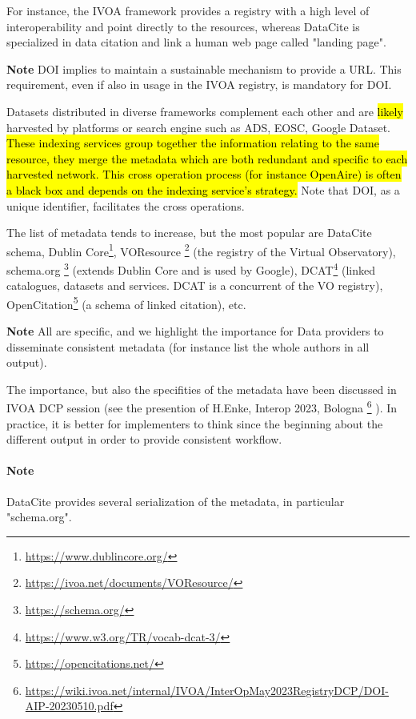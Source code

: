 \documentclass[11pt,a4paper]{ivoa}
\newcommand{\important}[1]{
	\begin{bigdescription}
		\item \color{ivoacolor}\textbf{Note} #1
	\end{bigdescription}
}
\begin{document}
For instance, the IVOA framework provides a registry with a high level  of interoperability and point directly to the resources, whereas DataCite is specialized in data citation and link a human web page called "landing page".

\important{
DOI implies to maintain a sustainable mechanism to provide a URL. 
This requirement, even if also in usage in the IVOA registry, is mandatory for DOI.
}

Datasets distributed in diverse frameworks complement each other and are \hl{likely} harvested by platforms or search engine such as ADS, EOSC, Google Dataset. 
\hl{These indexing services group together the information relating to the
	same resource, they merge the metadata which are both redundant and
	specific to each harvested network. This cross operation process
	(for instance OpenAire) is often a black box and depends on the
	indexing service's strategy.} %
Note that DOI, as a unique identifier, facilitates the cross operations.

The list of metadata tends to increase, but the most popular are DataCite schema, Dublin Core\footnote{\url{https://www.dublincore.org/}}, VOResource \footnote{\url{https://ivoa.net/documents/VOResource/}} (the registry of the Virtual Observatory), schema.org \footnote{\url{https://schema.org/}} (extends Dublin Core and is used by Google), DCAT\footnote{\url{https://www.w3.org/TR/vocab-dcat-3/}} (linked catalogues, datasets and services. DCAT is a concurrent of the VO registry), OpenCitation\footnote{\url{https://opencitations.net/}} (a schema of linked citation),  etc.

\important{
All are specific, and we highlight the importance for Data providers to disseminate consistent metadata
(for instance list the whole authors in all output).
}

The importance, but also the specifities of the metadata have been discussed in IVOA DCP session (see the presention of H.Enke, Interop 2023, Bologna \footnote{\url{https://wiki.ivoa.net/internal/IVOA/InterOpMay2023RegistryDCP/DOI-AIP-20230510.pdf}}
). In practice, it is better for implementers to think since the beginning about the different output in order to provide consistent workflow.

\paragraph{Note} DataCite provides several serialization of the metadata, in particular "schema.org".
\end{document}

